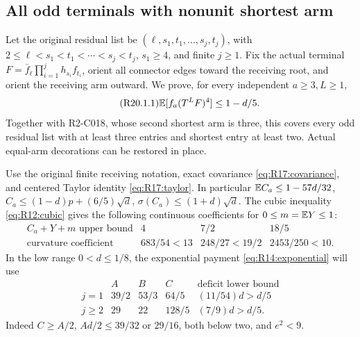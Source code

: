 \subsection{All odd terminals with nonunit shortest arm}\label{proof:R2-C020}
Let the original residual list be
$(\ell,s_1,t_1,\ldots,s_j,t_j)$, with
$2\le\ell<s_1<t_1<\cdots<s_j<t_j$, $s_1\ge4$, and finite $j\ge1$.
Fix the actual terminal $F=\bar f_\ell\prod_{i=1}^jh_{s_i}f_{t_i}$,
orient all connector edges toward the receiving root, and orient the
receiving arm outward. We prove, for every independent $a\ge3,L\ge1$,
\begin{equation}\tag{R20.1.1}\label{eq:R20:claim}
\mathbb E[f_a(T^LF)^4]\le1-d/5.
\end{equation}
Together with R2-C018, whose second shortest arm is three,
this covers every odd residual list with at least three entries and
shortest entry at least two. Actual equal-arm decorations can be restored in place.

Use the original finite receiving notation, exact covariance
\eqref{eq:R17:covariance}, and centered Taylor identity
\eqref{eq:R17:taylor}. In particular
$\mathbb E C_a\le1-57d/32$, $C_a\le(1-d)p+(6/5)\sqrt d$,
$\sigma(C_a)\le(1+d)\sqrt d$.
The cubic inequality \eqref{eq:R12:cubic} gives the following
continuous coefficients for $0\le m=\mathbb E Y\le1$:
\[
\begin{array}{c|ccc}
C_a+Y+m\text{ upper bound}&4&7/2&18/5\\\hline
\text{curvature coefficient}&683/54<13&248/27<19/2&2453/250<10.
\end{array}
\]
In the low range $0<d\le1/8$, the exponential payment
\eqref{eq:R14:exponential} will use
\begin{equation}\tag{R20.2.4}\label{eq:R20:payment}
\begin{array}{c|ccc|c}
 &A&B&C&\text{deficit lower bound}\\\hline
j=1&39/2&53/3&64/5&(11/54)d>d/5\\
j\ge2&29&22&128/5&(7/9)d>d/5.
\end{array}
\end{equation}
Indeed $C\ge A/2$, $Ad/2\le39/32$ or $29/16$, both below two,
and $e^2<9$.

